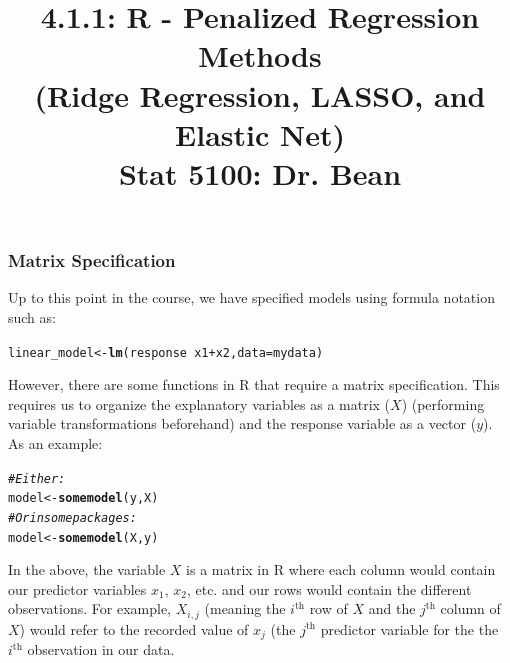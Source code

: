 \documentclass{article}\usepackage[]{graphicx}\usepackage[]{color}
\makeatletter
\newcommand{\hlcom}[1]{\textcolor[rgb]{0.678,0.584,0.686}{\textit{#1}}}%
\newcommand{\hlopt}[1]{\textcolor[rgb]{0,0,0}{#1}}%
\newcommand{\hlstd}[1]{\textcolor[rgb]{0.345,0.345,0.345}{#1}}%
\newcommand{\hlkwb}[1]{\textcolor[rgb]{0.69,0.353,0.396}{#1}}%
\newcommand{\hlkwc}[1]{\textcolor[rgb]{0.333,0.667,0.333}{#1}}%
\newcommand{\hlkwd}[1]{\textcolor[rgb]{0.737,0.353,0.396}{\textbf{#1}}}%
\newenvironment{kframe}{%
 \def\at@end@of@kframe{}%
 \ifinner\ifhmode%
  \def\at@end@of@kframe{\end{minipage}}%
  \begin{minipage}{\columnwidth}%
 \fi\fi%
 \def\FrameCommand##1{\hskip\@totalleftmargin \hskip-\fboxsep
 \colorbox{shadecolor}{##1}\hskip-\fboxsep
     \hskip-\linewidth \hskip-\@totalleftmargin \hskip\columnwidth}%
 \MakeFramed {\advance\hsize-\width
   \@totalleftmargin\z@ \linewidth\hsize
   \@setminipage}}%
 {\par\unskip\endMakeFramed%
 \at@end@of@kframe}
\newenvironment{knitrout}{}{} %
\makeatother
\begin{document}
\title{%
4.1.1: R - Penalized Regression Methods \\
(Ridge Regression, LASSO, and Elastic Net) \\
\smallskip
\large Stat 5100: Dr. Bean
}
\date{}

\maketitle

\subsubsection*{Matrix Specification}

Up to this point in the course, we have specified models using formula notation such as: 

\begin{knitrout}
\color{fgcolor}\begin{kframe}
\begin{alltt}
\hlstd{linear_model} \hlkwb{<-} \hlkwd{lm}\hlstd{(response} \hlopt{~} \hlstd{x1} \hlopt{+} \hlstd{x2,} \hlkwc{data} \hlstd{= mydata)}
\end{alltt}
\end{kframe}
\end{knitrout}

However, there are some functions in R that require a matrix specification. This requires us to organize the explanatory variables as a matrix ($X$) (performing variable transformations beforehand) and the response variable as a vector ($y$). As an example:

\begin{knitrout}
\color{fgcolor}\begin{kframe}
\begin{alltt}
\hlcom{# Either:}
\hlstd{model} \hlkwb{<-} \hlkwd{somemodel}\hlstd{(y, X)}
\hlcom{# Or in some packages:}
\hlstd{model} \hlkwb{<-} \hlkwd{somemodel}\hlstd{(X, y)}
\end{alltt}
\end{kframe}
\end{knitrout}

In the above, the variable $X$ is a matrix in R where each column would contain our predictor variables $x_1$, $x_2$, etc. and our rows would contain the different observations. For example, $X_{i, j}$ (meaning the $i^\text{th}$ row of $X$ and the $j^\text{th}$ column of $X$) would refer to the recorded value of $x_j$ (the $j^\text{th}$ predictor variable for the the $i^\text{th}$ observation in our data.
\end{document}
